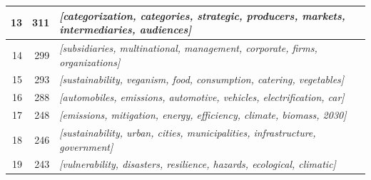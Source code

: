 \documentclass[12pt]{article}
\begin{document}
\begin{landscape}
\begin{table}[ht]
\begin{tabular}{|r|r|p{12cm}|}
13             & 311            & \textit{[categorization, categories, strategic, producers, markets, intermediaries, audiences]} \\ \hline
14             & 299            & \textit{[subsidiaries, multinational, management, corporate, firms, organizations]} \\ \hline
15             & 293            & \textit{[sustainability, veganism, food, consumption, catering, vegetables]} \\ \hline
16             & 288            & \textit{[automobiles, emissions, automotive, vehicles, electrification, car]} \\ \hline
17             & 248            & \textit{[emissions, mitigation, energy, efficiency, climate, biomass, 2030]} \\ \hline
18             & 246            & \textit{[sustainability, urban, cities, municipalities, infrastructure, government]} \\ \hline
19             & 243            & \textit{[vulnerability, disasters, resilience, hazards, ecological, climatic]} \\ \hline
\end{tabular}
\end{table}
\end{landscape}
\end{document}
